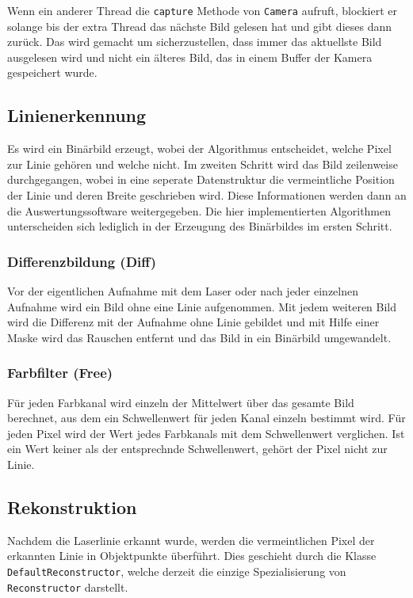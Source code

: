 \documentclass[ngerman,a4paper,parskip=half]{scrartcl}
\begin{document}
Wenn ein anderer Thread die \texttt{capture} Methode von \texttt{Camera} aufruft, blockiert er solange bis der extra Thread das nächste Bild gelesen hat und gibt dieses dann zurück. Das wird gemacht um sicherzustellen, dass immer das aktuellste Bild ausgelesen wird und nicht ein älteres Bild, das in einem Buffer der Kamera gespeichert wurde.


\subsection{Linienerkennung}

Es wird ein Binärbild erzeugt, wobei der Algorithmus entscheidet, welche Pixel zur Linie gehören und welche nicht. Im zweiten Schritt wird das Bild zeilenweise durchgegangen, wobei in eine seperate Datenstruktur die vermeintliche Position der Linie und deren Breite geschrieben wird. Diese Informationen werden dann an die Auswertungssoftware weitergegeben. Die hier implementierten Algorithmen unterscheiden sich lediglich in der Erzeugung des Binärbildes im ersten Schritt.

\subsubsection{Differenzbildung (Diff)}

Vor der eigentlichen Aufnahme mit dem Laser oder nach jeder einzelnen Aufnahme wird ein Bild ohne eine Linie aufgenommen. Mit jedem weiteren Bild wird die Differenz mit der Aufnahme ohne Linie gebildet und mit Hilfe einer Maske wird das Rauschen entfernt und das Bild in ein Binärbild umgewandelt.

\subsubsection{Farbfilter (Free)}

Für jeden Farbkanal wird einzeln der Mittelwert über das gesamte Bild berechnet, aus dem ein Schwellenwert für jeden Kanal einzeln bestimmt wird. Für jeden Pixel wird der Wert jedes Farbkanals mit dem Schwellenwert verglichen. Ist ein Wert keiner als der entsprechnde Schwellenwert, gehört der Pixel nicht zur Linie.

\subsection{Rekonstruktion}

Nachdem die Laserlinie erkannt wurde, werden die vermeintlichen Pixel der erkannten Linie in Objektpunkte überführt. Dies geschieht durch die Klasse \texttt{DefaultReconstructor}, welche derzeit die einzige Spezialisierung von \texttt{Reconstructor} darstellt.
\end{document}
